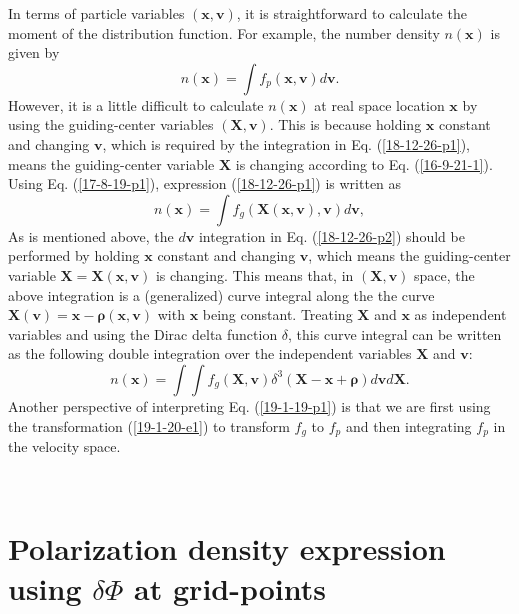 \documentclass{llncs}
\newcommand{\tmmathbf}[1]{\ensuremath{\boldsymbol{#1}}}
\begin{document}
In terms of particle variables $(\mathbf{x}, \mathbf{v})$, it is
straightforward to calculate the moment of the distribution function. For
example, the number density $n (\mathbf{x})$ is given by
\begin{equation}
  \label{18-12-26-p1} n (\mathbf{x}) = \int f_p (\mathbf{x}, \mathbf{v})
  d\mathbf{v}.
\end{equation}
However, it is a little difficult to calculate $n (\mathbf{x})$ at real space
location $\mathbf{x}$ by using the guiding-center variables $(\mathbf{X},
\mathbf{v})$. This is because holding $\mathbf{x}$ constant and changing
$\mathbf{v}$, which is required by the integration in Eq. (\ref{18-12-26-p1}),
means the guiding-center variable $\mathbf{X}$ is changing according to Eq.
(\ref{16-9-21-1}). Using Eq. (\ref{17-8-19-p1}), expression
(\ref{18-12-26-p1}) is written as
\begin{equation}
  \label{18-12-26-p2} n (\mathbf{x}) = \int f_g (\mathbf{X} (\mathbf{x},
  \mathbf{v}), \mathbf{v}) d\mathbf{v},
\end{equation}
As is mentioned above, the $d\mathbf{v}$ integration in Eq.
(\ref{18-12-26-p2}) should be performed by holding $\mathbf{x}$ constant and
changing $\mathbf{v}$, which means the guiding-center variable
$\mathbf{X}=\mathbf{X} (\mathbf{x}, \mathbf{v})$ is changing. This means that,
in $(\mathbf{X}, \mathbf{v})$ space, the above integration is a (generalized)
curve integral along the the curve \ $\mathbf{X} (\mathbf{v})
=\mathbf{x}-\tmmathbf{\rho} (\mathbf{x}, \mathbf{v})$ with $\mathbf{x}$ being
constant. Treating $\mathbf{X}$ and $\mathbf{x}$ as independent variables and
using the Dirac delta function $\delta$, this curve integral can be written as
the following double integration over the independent variables $\mathbf{X}$
and $\mathbf{v}$:
\begin{equation}
  \label{19-1-19-p1} n (\mathbf{x}) = \int \int f_g (\mathbf{X}, \mathbf{v})
  \delta^3 (\mathbf{X}-\mathbf{x}+\tmmathbf{\rho}) d\mathbf{v}d\mathbf{X}.
\end{equation}
Another perspective of interpreting Eq. (\ref{19-1-19-p1}) is that we are
first using the transformation (\ref{19-1-20-e1}) to transform $f_g$ to $f_p$
and then integrating $f_p$ in the velocity space.

\

\section{Polarization density expression using $\delta \Phi$ at grid-points }
\end{document}
